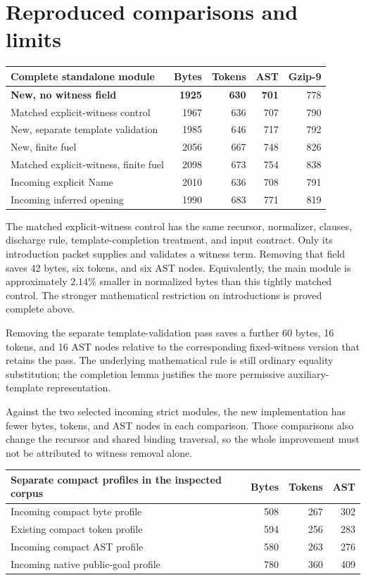 \section{Reproduced comparisons and limits}
\label{sec:comparisons}

\begin{center}
\begin{tabular}{lrrrr}
\toprule
Complete standalone module & Bytes & Tokens & AST & Gzip-9\\
\midrule
\textbf{New, no witness field} & \textbf{1925}&\textbf{630}&\textbf{701}&778\\
Matched explicit-witness control &1967&636&707&790\\
New, separate template validation &1985&646&717&792\\
New, finite fuel &2056&667&748&826\\
Matched explicit-witness, finite fuel &2098&673&754&838\\
\midrule
Incoming explicit Name &2010&636&708&791\\
Incoming inferred opening &1990&683&771&819\\
\bottomrule
\end{tabular}
\end{center}

The matched explicit-witness control has the same recursor, normalizer,
clauses, discharge rule, template-completion treatment, and input contract.
Only its introduction packet supplies and validates a witness term.
Removing that field saves 42 bytes, six tokens, and six AST nodes.
Equivalently, the main module is approximately $2.14\%$ smaller in
normalized bytes than this tightly matched control. The stronger
mathematical restriction on introductions is proved complete above.

Removing the separate template-validation pass saves a further 60 bytes,
16 tokens, and 16 AST nodes relative to the corresponding fixed-witness
version that retains the pass. The underlying mathematical rule is still
ordinary equality substitution; the completion lemma justifies the
more permissive auxiliary-template representation.

Against the two selected incoming strict modules, the new implementation
has fewer bytes, tokens, and AST nodes in each comparison. Those comparisons
also change the recursor and shared binding traversal, so the whole
improvement must not be attributed to witness removal alone.

\begin{center}
\begin{tabular}{lrrr}
\toprule
Separate compact profiles in the inspected corpus & Bytes & Tokens & AST\\
\midrule
Incoming compact byte profile &508&267&302\\
Existing compact token profile &594&256&283\\
Incoming compact AST profile &580&263&276\\
Incoming native public-goal profile &780&360&409\\
\bottomrule
\end{tabular}
\end{center}

